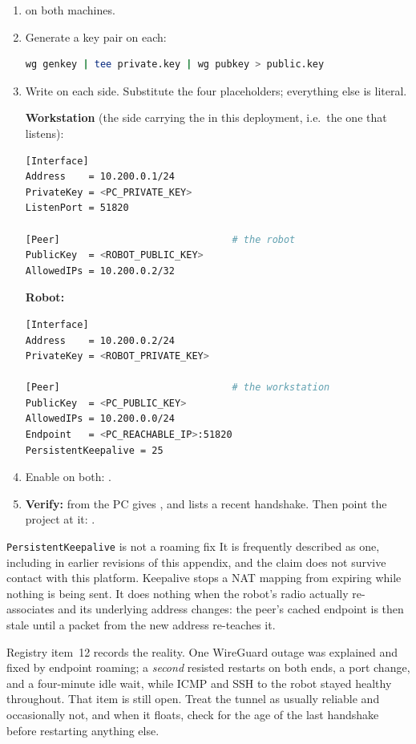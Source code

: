 \begin{enumerate}[leftmargin=1.4em]
\item {} on both machines.
\item Generate a key pair on each:
\begin{lstlisting}[language=bash]
wg genkey | tee private.key | wg pubkey > public.key
\end{lstlisting}
\item Write  on each side. Substitute the four
  placeholders; everything else is literal.

\textbf{Workstation} (the side carrying the  in this
deployment, i.e.\ the one that listens):
\begin{lstlisting}[language=bash]
[Interface]
Address    = 10.200.0.1/24
PrivateKey = <PC_PRIVATE_KEY>
ListenPort = 51820

[Peer]                              # the robot
PublicKey  = <ROBOT_PUBLIC_KEY>
AllowedIPs = 10.200.0.2/32
\end{lstlisting}

\textbf{Robot:}
\begin{lstlisting}[language=bash]
[Interface]
Address    = 10.200.0.2/24
PrivateKey = <ROBOT_PRIVATE_KEY>

[Peer]                              # the workstation
PublicKey  = <PC_PUBLIC_KEY>
AllowedIPs = 10.200.0.0/24
Endpoint   = <PC_REACHABLE_IP>:51820
PersistentKeepalive = 25
\end{lstlisting}

\item Enable on both: .
\item \textbf{Verify:}  from the PC gives
  , and  lists a recent handshake.
  Then point the project at it:
  .
\end{enumerate}

\begin{trapbox}{\texttt{PersistentKeepalive} is not a roaming fix}
It is frequently described as one, including in earlier revisions of this
appendix, and the claim does not survive contact with this platform.
Keepalive stops a NAT mapping from expiring while nothing is being sent. It
does nothing when the robot's radio actually re-associates and its underlying
address changes: the peer's cached endpoint is then stale until a packet from
the new address re-teaches it.

Registry item~12 records the reality. One WireGuard outage was explained and
fixed by endpoint roaming; a \emph{second} resisted restarts on both ends, a
port change, and a four-minute idle wait, while ICMP and SSH to the robot
stayed healthy throughout. That item is still open. Treat the tunnel as
usually reliable and occasionally not, and when it floats, check
 for the age of the last handshake before restarting
anything else.
\end{trapbox}

